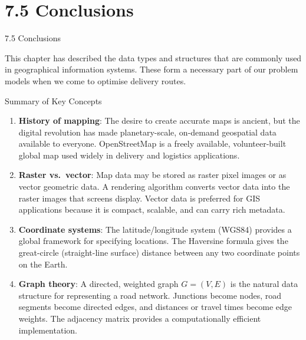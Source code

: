 \documentclass[aspectratio=169,10pt]{beamer}
\begin{document}
\section{7.5 Conclusions}

\begin{frame}[allowframebreaks]{7.5 Conclusions}

  This chapter has described the data types and structures that are
  commonly used in geographical information systems.  These form a
  necessary part of our problem models when we come to optimise
  delivery routes.

  \begin{block}{Summary of Key Concepts}
    \begin{enumerate}
      \item \textbf{History of mapping}: The desire to create accurate
            maps is ancient, but the digital revolution has made
            planetary-scale, on-demand geospatial data available to
            everyone.  OpenStreetMap is a freely available, volunteer-built
            global map used widely in delivery and logistics applications.

      \item \textbf{Raster vs.\ vector}: Map data may be stored as raster
            pixel images or as vector geometric data.  A rendering
            algorithm converts vector data into the raster images that
            screens display.  Vector data is preferred for GIS
            applications because it is compact, scalable, and can carry
            rich metadata.

      \item \textbf{Coordinate systems}: The latitude/longitude system
            (WGS84) provides a global framework for specifying locations.
            The Haversine formula gives the great-circle (straight-line
            surface) distance between any two coordinate points on the
            Earth.

      \item \textbf{Graph theory}: A directed, weighted graph $G = (V, E)$
            is the natural data structure for representing a road network.
            Junctions become nodes, road segments become directed edges,
            and distances or travel times become edge weights.  The
            adjacency matrix provides a computationally efficient
            implementation.
    \end{enumerate}
  \end{block}


\end{frame}
\end{document}
